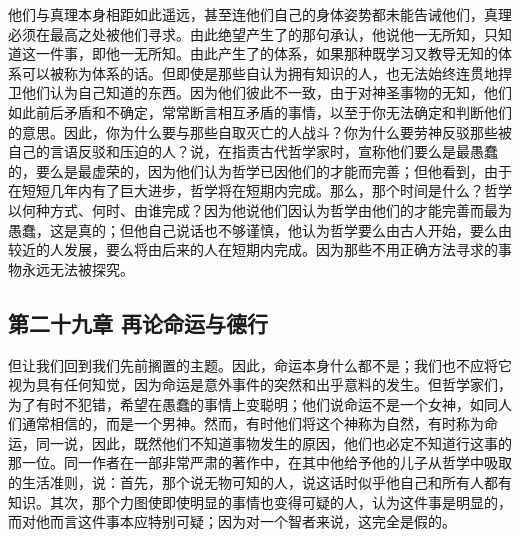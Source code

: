 他们与真理本身相距如此遥远，甚至连他们自己的身体姿势都未能告诫他们，真理必须在最高之处被他们寻求。由此绝望产生了的那句承认，他说他一无所知，只知道这一件事，即他一无所知。由此产生了的体系，如果那种既学习又教导无知的体系可以被称为体系的话。但即使是那些自认为拥有知识的人，也无法始终连贯地捍卫他们认为自己知道的东西。因为他们彼此不一致，由于对神圣事物的无知，他们如此前后矛盾和不确定，常常断言相互矛盾的事情，以至于你无法确定和判断他们的意思。因此，你为什么要与那些自取灭亡的人战斗？你为什么要劳神反驳那些被自己的言语反驳和压迫的人？说，在指责古代哲学家时，宣称他们要么是最愚蠢的，要么是最虚荣的，因为他们认为哲学已因他们的才能而完善；但他看到，由于在短短几年内有了巨大进步，哲学将在短期内完成。那么，那个时间是什么？哲学以何种方式、何时、由谁完成？因为他说他们因认为哲学由他们的才能完善而最为愚蠢，这是真的；但他自己说话也不够谨慎，他认为哲学要么由古人开始，要么由较近的人发展，要么将由后来的人在短期内完成。因为那些不用正确方法寻求的事物永远无法被探究。\par


\subsection{第二十九章 再论命运与德行}

但让我们回到我们先前搁置的主题。因此，命运本身什么都不是；我们也不应将它视为具有任何知觉，因为命运是意外事件的突然和出乎意料的发生。但哲学家们，为了有时不犯错，希望在愚蠢的事情上变聪明；他们说命运不是一个女神，如同人们通常相信的，而是一个男神。然而，有时他们将这个神称为自然，有时称为命运，同一说，因此，既然他们不知道事物发生的原因，他们也必定不知道行这事的那一位。同一作者在一部非常严肃的著作中，在其中他给予他的儿子从哲学中吸取的生活准则，说：首先，那个说无物可知的人，说这话时似乎他自己和所有人都有知识。其次，那个力图使即使明显的事情也变得可疑的人，认为这件事是明显的，而对他而言这件事本应特别可疑；因为对一个智者来说，这完全是假的。\par

